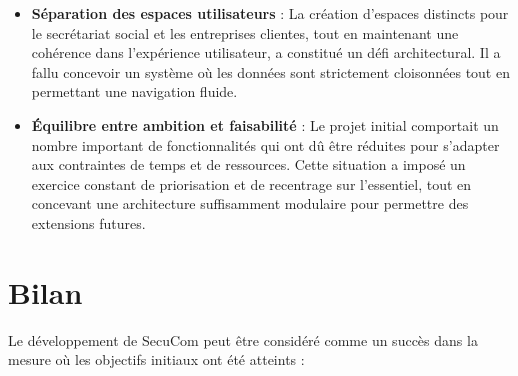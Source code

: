 \begin{itemize}
  \item \textbf{Séparation des espaces utilisateurs} : La création d'espaces distincts pour le secrétariat social et les entreprises clientes, tout en maintenant une cohérence dans l'expérience utilisateur, a constitué un défi architectural. Il a fallu concevoir un système où les données sont strictement cloisonnées tout en permettant une navigation fluide.

  \item \textbf{Équilibre entre ambition et faisabilité} : Le projet initial comportait un nombre important de fonctionnalités qui ont dû être réduites pour s'adapter aux contraintes de temps et de ressources. Cette situation a imposé un exercice constant de priorisation et de recentrage sur l'essentiel, tout en concevant une architecture suffisamment modulaire pour permettre des extensions futures.
\end{itemize}

\section{Bilan}

Le développement de SecuCom peut être considéré comme un succès dans la mesure où les objectifs initiaux ont été atteints :

